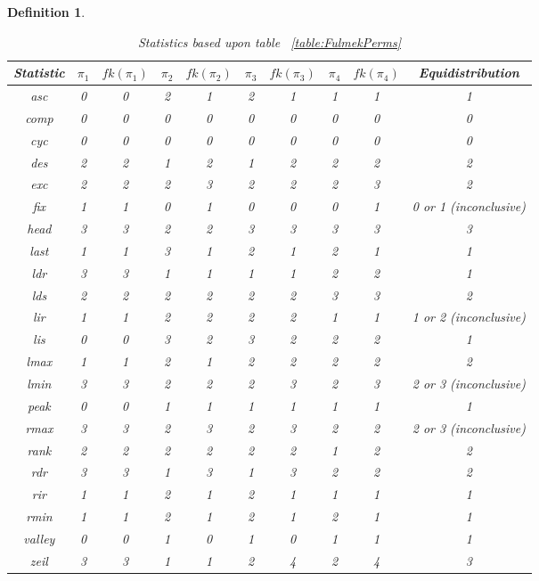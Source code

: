 \documentclass[12pt]{article}
\newtheorem{definition}{Definition}
\begin{document}
\begin{definition}
\begin{table}[H]
\caption{Statistics based upon table ~\ref{table:FulmekPerms}}
\centering
\begin{tabular}{c | c c c c c c c c | c}
\hline\hline
Statistic & $\pi_1$ & $fk(\pi_1)$ & $\pi_2$ & $fk(\pi_2)$ & $\pi_3$ & $fk(\pi_3)$ & $\pi_4$ & $fk(\pi_4)$ & Equidistribution\\ [0.5ex]
\hline
asc & 0 & 0 & 2 & 1 & 2 & 1 & 1 & 1 & 1\\ 
comp & 0 & 0 & 0 & 0 & 0 & 0 & 0 & 0 & 0\\
cyc & 0 & 0 & 0 & 0 & 0 & 0 & 0 & 0 & 0\\
des & 2 & 2 & 1 & 2 & 1 & 2 & 2 & 2 & 2\\
exc & 2 & 2 & 2 & 3 & 2 & 2 & 2 & 3 & 2\\
fix & 1 & 1 & 0 & 1 & 0 & 0 & 0 & 1 & 0 or 1 (inconclusive)\\
head & 3 & 3 & 2 & 2 & 3 & 3 & 3 & 3 & 3\\
last & 1 & 1 & 3 & 1 & 2 & 1 & 2 & 1 & 1\\
ldr & 3 & 3 & 1 & 1 & 1 & 1 & 2 & 2 & 1\\
lds & 2 & 2 & 2 & 2 & 2 & 2 & 3 & 3 & 2\\
lir & 1 & 1 & 2 & 2 & 2 & 2 & 1 & 1 & 1 or 2 (inconclusive)\\
lis & 0 & 0 & 3 & 2 & 3 & 2 & 2 & 2 & 1\\
lmax & 1 & 1 & 2 & 1 & 2 & 2 & 2 & 2 & 2\\
lmin & 3 & 3 & 2 & 2 & 2 & 3 & 2 & 3 & 2 or 3 (inconclusive)\\
peak & 0 & 0 & 1 & 1 & 1 & 1 & 1 & 1 & 1\\
rmax & 3 & 3 & 2 & 3 & 2 & 3 & 2 & 2 & 2 or 3 (inconclusive)\\
rank & 2 & 2 & 2 & 2 & 2 & 2 & 1 & 2 & 2\\
rdr & 3 & 3 & 1 & 3 & 1 & 3 & 2 & 2 & 2\\
rir & 1 & 1 & 2 & 1 & 2 & 1 & 1 & 1 & 1\\
rmin & 1 & 1 & 2 & 1 & 2 & 1 & 2 & 1 & 1\\
valley & 0 & 0 & 1 & 0 & 1 & 0 & 1 & 1 & 1\\
zeil & 3 & 3 & 1 & 1 & 2 & 4 & 2 & 4 & 3\\
\hline
\end{tabular}
\label{table:FulmekPerms1}
\end{table}
\newpage


\end{definition}
\end{document}
